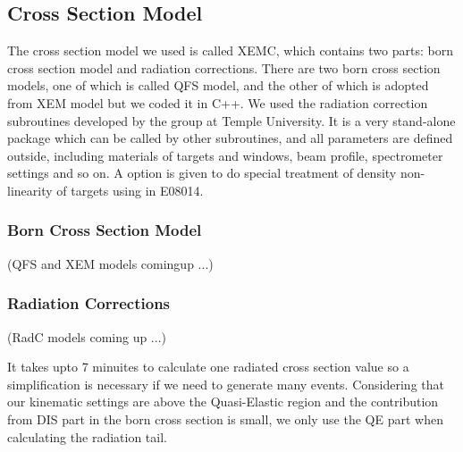 \documentclass[a4paper,10.5pt]{report}
\begin{document}
\subsection{Cross Section Model}
The cross section model we used is called XEMC, which contains two parts: born cross section model and radiation corrections. There are two born cross section models, one of which is called QFS model\cite{temple_qfs}, and the other of which is adopted from XEM model\cite{xem} but we coded it in C++. We used the radiation correction subroutines developed by the group at Temple University. It is a very stand-alone package which can be called by other subroutines, and all parameters are defined outside, including materials of targets and windows, beam profile, spectrometer settings and so on. A option is given to do special treatment of density non-linearity of targets using in E08014.

\subsubsection{Born Cross Section Model}
 (QFS and XEM models comingup ...)
\subsubsection{Radiation Corrections}
 (RadC models coming up ...)

 It takes upto 7 minuites to calculate one radiated cross section value so a simplification is necessary if we need to generate many events. Considering that our kinematic settings are above the Quasi-Elastic region and the contribution from DIS part in the born cross section is small, we only use the QE part when calculating the radiation tail.
\end{document}
